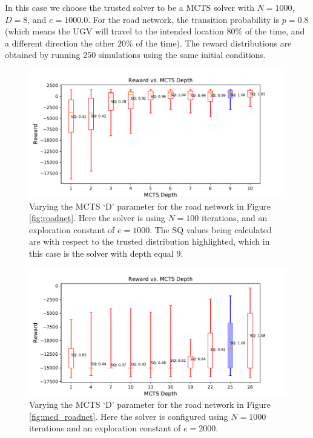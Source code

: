 In this case we choose the trusted solver to be a MCTS solver with $N=1000$, $D=8$, and $e=1000.0$. For the road network, the transition probability is $p=0.8$ (which means the UGV will travel to the intended location $80\%$ of the time, and a different direction the other $20\%$ of the time). The reward distributions are obtained by running 250 simulations using the same initial conditions.

\begin{figure}[tbp]
    \centering
    \includegraphics[width=0.6\linewidth]{Figures/sq_roadnet_mcts_i100e1000.pdf}
    \caption{Varying the MCTS `D' parameter for the road network in Figure \ref{fig:roadnet}. Here the solver is using $N=100$ iterations, and an exploration constant of $e=1000$. The SQ values being calculated are with respect to the trusted distribution highlighted, which in this case is the solver with depth equal 9.}
    \label{fig:mcts_d}
\end{figure}
\begin{figure}[tbp]
    \centering
    \includegraphics[width=0.6\linewidth]{Figures/sq_mednet_mcts_i1000e2000.pdf}
    \caption{Varying the MCTS `D' parameter for the road network in Figure \ref{fig:med_roadnet}. Here the solver is configured using $N=1000$ iterations and an exploration constant of $e=2000$.}
    \label{fig:mcts_d_med}
\end{figure}

